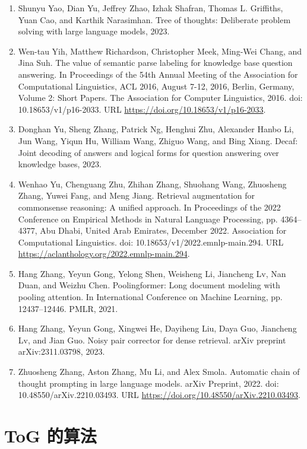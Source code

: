 \documentclass[11pt,UTF8,fontset=fandol]{ctexart}
\begin{document}
\begin{enumerate}[leftmargin=2em]
\item Shunyu Yao, Dian Yu, Jeffrey Zhao, Izhak Shafran, Thomas L. Griffiths, Yuan Cao, and Karthik Narasimhan. Tree of thoughts: Deliberate problem solving with large language models, 2023.
\item Wen-tau Yih, Matthew Richardson, Christopher Meek, Ming-Wei Chang, and Jina Suh. The value of semantic parse labeling for knowledge base question answering. In Proceedings of the 54th Annual Meeting of the Association for Computational Linguistics, ACL 2016, August 7-12, 2016, Berlin, Germany, Volume 2: Short Papers. The Association for Computer Linguistics, 2016. doi: 10.18653/v1/p16-2033. URL \url{https://doi.org/10.18653/v1/p16-2033}.
\item Donghan Yu, Sheng Zhang, Patrick Ng, Henghui Zhu, Alexander Hanbo Li, Jun Wang, Yiqun Hu, William Wang, Zhiguo Wang, and Bing Xiang. Decaf: Joint decoding of answers and logical forms for question answering over knowledge bases, 2023.
\item Wenhao Yu, Chenguang Zhu, Zhihan Zhang, Shuohang Wang, Zhuosheng Zhang, Yuwei Fang, and Meng Jiang. Retrieval augmentation for commonsense reasoning: A unified approach. In Proceedings of the 2022 Conference on Empirical Methods in Natural Language Processing, pp. 4364--4377, Abu Dhabi, United Arab Emirates, December 2022. Association for Computational Linguistics. doi: 10.18653/v1/2022.emnlp-main.294. URL \url{https://aclanthology.org/2022.emnlp-main.294}.
\item Hang Zhang, Yeyun Gong, Yelong Shen, Weisheng Li, Jiancheng Lv, Nan Duan, and Weizhu Chen. Poolingformer: Long document modeling with pooling attention. In International Conference on Machine Learning, pp. 12437--12446. PMLR, 2021.
\item Hang Zhang, Yeyun Gong, Xingwei He, Dayiheng Liu, Daya Guo, Jiancheng Lv, and Jian Guo. Noisy pair corrector for dense retrieval. arXiv preprint arXiv:2311.03798, 2023.
\item Zhuosheng Zhang, Aston Zhang, Mu Li, and Alex Smola. Automatic chain of thought prompting in large language models. arXiv Preprint, 2022. doi: 10.48550/arXiv.2210.03493. URL \url{https://doi.org/10.48550/arXiv.2210.03493}.
\end{enumerate}

\appendix

\section{ToG 的算法}
\end{document}
